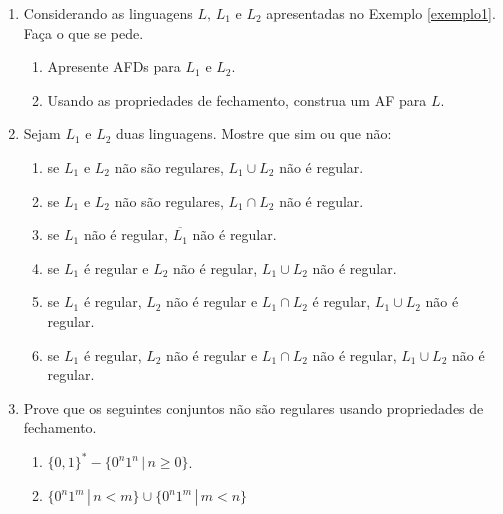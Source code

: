 \documentclass[a4paper]{article}
\theoremstyle{definition}
\begin{document}
  \begin{enumerate}
     \item Considerando as linguagens $L,\,L_1$ e $L_2$ apresentadas no
       Exemplo \ref{exemplo1}. Faça o que se pede.
       \begin{enumerate}
         \item Apresente AFDs para $L_1$ e $L_2$.
         \item Usando as propriedades de fechamento, construa um AF para $L$.
         \end{enumerate}
       \item Sejam $L_1$ e $L_2$ duas linguagens. Mostre que sim ou que não:
         \begin{enumerate}
          \item se $L_1$ e $L_2$ não são regulares, $L_1\cup L_2$ não
                é regular.
          \item se $L_1$ e $L_2$ não são regulares, $L_1\cap L_2$ não
                é regular.
          \item se $L_1$ não é regular, $\overline{L_1}$ não é regular.
          \item se $L_1$ é regular e $L_2$ não é regular,
                $L_1\cup L_2$ não é regular.
          \item se $L_1$ é regular, $L_2$ não é regular e
                $L_1\cap L_2$ é regular, $L_1\cup L_2$ não é regular.
          \item se $L_1$ é regular, $L_2$ não é regular e
                $L_1\cap L_2$ não é regular, $L_1\cup L_2$ não é regular.
       \end{enumerate}
     \item Prove que os seguintes conjuntos não são regulares usando
       propriedades de fechamento.
       \begin{enumerate}
          \item $\{0,1\}^* - \{0^n1^n\,|\,n \geq 0\}$.
          \item $\{0^n1^m \,|\, n < m\} \cup \{0^n1^m\,|\, m < n\}$
       \end{enumerate}
  \end{enumerate}
\end{document}
